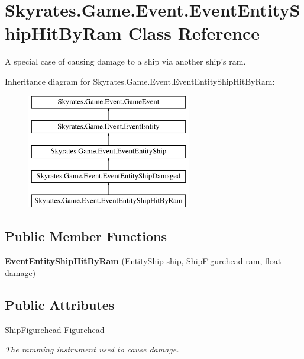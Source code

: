 \hypertarget{class_skyrates_1_1_game_1_1_event_1_1_event_entity_ship_hit_by_ram}{\section{Skyrates.\-Game.\-Event.\-Event\-Entity\-Ship\-Hit\-By\-Ram Class Reference}
\label{class_skyrates_1_1_game_1_1_event_1_1_event_entity_ship_hit_by_ram}
}


A special case of causing damage to a ship via another ship's ram.  


Inheritance diagram for Skyrates.\-Game.\-Event.\-Event\-Entity\-Ship\-Hit\-By\-Ram\-:\begin{figure}[H]
\begin{center}
\leavevmode
\includegraphics[height=5.000000cm]{class_skyrates_1_1_game_1_1_event_1_1_event_entity_ship_hit_by_ram}
\end{center}
\end{figure}
\subsection*{Public Member Functions}
\begin{DoxyCompactItemize}
\item 
\hypertarget{class_skyrates_1_1_game_1_1_event_1_1_event_entity_ship_hit_by_ram_a285cc8cd7b110b3773830928e983e129}{{\bfseries Event\-Entity\-Ship\-Hit\-By\-Ram} (\hyperlink{class_skyrates_1_1_entity_1_1_entity_ship}{Entity\-Ship} ship, \hyperlink{class_skyrates_1_1_ship_1_1_ship_figurehead}{Ship\-Figurehead} ram, float damage)}\label{class_skyrates_1_1_game_1_1_event_1_1_event_entity_ship_hit_by_ram_a285cc8cd7b110b3773830928e983e129}

\end{DoxyCompactItemize}
\subsection*{Public Attributes}
\begin{DoxyCompactItemize}
\item 
\hyperlink{class_skyrates_1_1_ship_1_1_ship_figurehead}{Ship\-Figurehead} \hyperlink{class_skyrates_1_1_game_1_1_event_1_1_event_entity_ship_hit_by_ram_a6df0869cd6c096d332f5e93f2c521f2a}{Figurehead}
\begin{DoxyCompactList}\small\item\em The ramming instrument used to cause damage. \end{DoxyCompactList}\end{DoxyCompactItemize}

